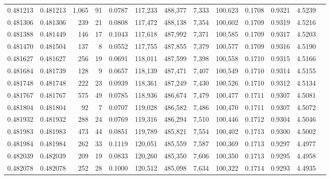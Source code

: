\begin{tabular}{rrrrrrrrrrrrr}
0.481213 & 0.481213 & 1,065 &    91 &                                     0.0787 & 117,233 & 488,377 &   7,333 & 100,623 & 0.1708 & 0.9321 & 4.5239 \\
0.481306 & 0.481306 &   239 &    21 &                                     0.0808 & 117,472 & 488,138 &   7,354 & 100,602 & 0.1709 & 0.9319 & 4.5216 \\
0.481388 & 0.481449 &   146 &    17 &                                     0.1043 & 117,618 & 487,992 &   7,371 & 100,585 & 0.1709 & 0.9317 & 4.5203 \\
0.481470 & 0.481504 &   137 &     8 &                                     0.0552 & 117,755 & 487,855 &   7,379 & 100,577 & 0.1709 & 0.9316 & 4.5190 \\
0.481627 & 0.481627 &   256 &    19 &                                     0.0691 & 118,011 & 487,599 &   7,398 & 100,558 & 0.1710 & 0.9315 & 4.5166 \\
0.481684 & 0.481739 &   128 &     9 &                                     0.0657 & 118,139 & 487,471 &   7,407 & 100,549 & 0.1710 & 0.9314 & 4.5155 \\
0.481748 & 0.481748 &   222 &    23 &                                     0.0939 & 118,361 & 487,249 &   7,430 & 100,526 & 0.1710 & 0.9312 & 4.5134 \\
0.481767 & 0.481767 &   575 &    49 &                                     0.0785 & 118,936 & 486,674 &   7,479 & 100,477 & 0.1711 & 0.9307 & 4.5081 \\
0.481804 & 0.481804 &    92 &     7 &                                     0.0707 & 119,028 & 486,582 &   7,486 & 100,470 & 0.1711 & 0.9307 & 4.5072 \\
0.481932 & 0.481932 &   288 &    24 &                                     0.0769 & 119,316 & 486,294 &   7,510 & 100,446 & 0.1712 & 0.9304 & 4.5046 \\
0.481983 & 0.481983 &   473 &    44 &                                     0.0851 & 119,789 & 485,821 &   7,554 & 100,402 & 0.1713 & 0.9300 & 4.5002 \\
0.481984 & 0.481984 &   262 &    33 &                                     0.1119 & 120,051 & 485,559 &   7,587 & 100,369 & 0.1713 & 0.9297 & 4.4977 \\
0.482039 & 0.482039 &   209 &    19 &                                     0.0833 & 120,260 & 485,350 &   7,606 & 100,350 & 0.1713 & 0.9295 & 4.4958 \\
0.482078 & 0.482078 &   252 &    28 &                                     0.1000 & 120,512 & 485,098 &   7,634 & 100,322 & 0.1714 & 0.9293 & 4.4935 \\

\end{tabular}
